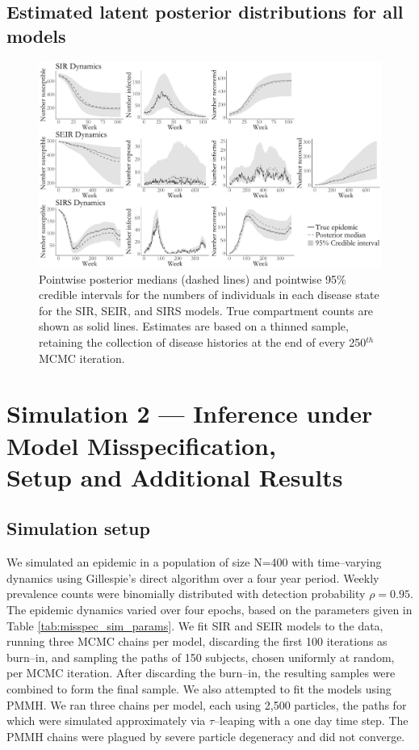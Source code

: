 \subsection{Estimated latent posterior distributions for all models}
\begin{figure}[htbp]
	\centering
	\includegraphics[width=\linewidth]{figures/sim1_latent_posts_all.pdf}
	\caption[Simulation 1 latent posterior distributions for all models.]{Pointwise posterior medians (dashed lines) and pointwise 95\% credible intervals for the numbers of individuals in each disease state for the SIR, SEIR, and SIRS models. True compartment counts are shown as solid lines. Estimates are based on a thinned sample, retaining the collection of disease histories at the end of every 250$ ^{th} $ MCMC iteration.}
	\label{fig:sim1_latent_post_all}
\end{figure}

\newpage
\section{Simulation 2 --- Inference under Model Misspecification,\\ Setup and Additional Results}
\label{sec:bda_misspec_sim_details}
\subsection{Simulation setup}
We simulated an epidemic in a population of size N=400 with time--varying dynamics using Gillespie's direct algorithm over a four year period. Weekly prevalence counts were binomially distributed with detection probability $ \rho = 0.95 $. The epidemic dynamics varied over four epochs, based on the parameters given in Table \ref{tab:misspec_sim_params}. We fit SIR and SEIR models to the data, running three MCMC chains per model, discarding the first 100 iterations as burn--in, and sampling the paths of 150 subjects, chosen uniformly at random, per MCMC iteration. After discarding the burn--in, the resulting samples were combined to form the final sample. We also attempted to fit the models using PMMH. We ran three chains per model, each using 2,500 particles, the paths for which were simulated approximately via $ \tau$--leaping with a one day time step. The PMMH chains were plagued by severe particle degeneracy and did not converge.

